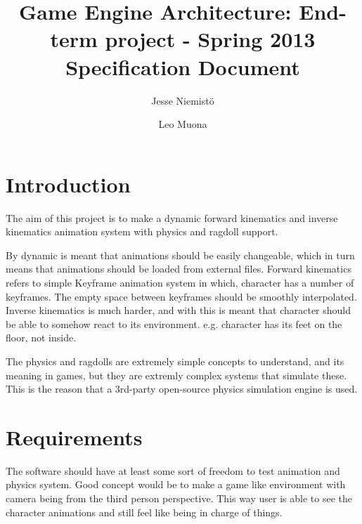 \documentclass[11pt,twoside,a4paper]{article}
\begin{document}
\author{Jesse Niemistö \and Leo Muona}
\title{Game Engine Architecture: End-term project - Spring 2013 \\
       Specification Document}

\maketitle

\section{Introduction}

The aim of this project is to make a dynamic forward kinematics and inverse kinematics animation system with physics and ragdoll support.

By dynamic is meant that animations should be easily changeable, which in turn means that animations should be loaded from external files. Forward kinematics refers to simple Keyframe animation system in which, character has a number of keyframes. The empty space between keyframes should be smoothly interpolated. Inverse kinematics is much harder, and with this is meant that character should be able to somehow react to its environment. e.g. character has its feet on the floor, not inside.

The physics and ragdolls are extremely simple concepts to understand, and its meaning in games, but they are extremly complex systems that simulate these. This is the reason that a 3rd-party open-source physics simulation engine is used.

\section{Requirements}

The software should have at least some sort of freedom to test animation and physics system. Good concept would be to make a game like environment with camera being from the third person perspective. This way user is able to see the character animations and still feel like being in charge of things.
\end{document}
